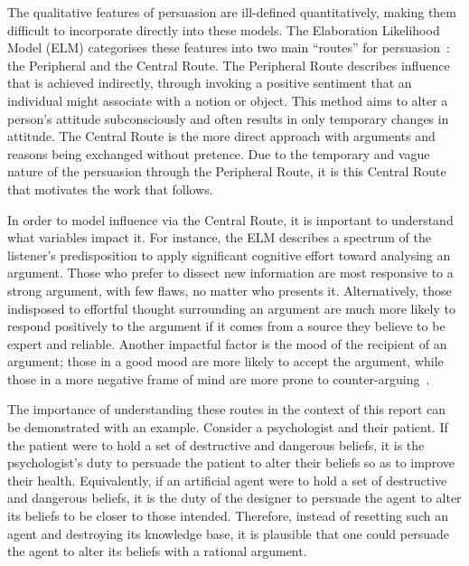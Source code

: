 The qualitative features of persuasion are ill-defined quantitatively, making them difficult to incorporate directly into these models. The Elaboration Likelihood Model (ELM) categorises these features into two main ``routes'' for persuasion~\cite{Petty1997ThePsychology}: the Peripheral and the Central Route. The Peripheral Route describes influence that is achieved indirectly, through invoking a positive sentiment that an individual might associate with a notion or object. This method aims to alter a person's attitude subconsciously and often results in only temporary changes in attitude. The Central Route is the more direct approach with arguments and reasons being exchanged without pretence. Due to the temporary and vague nature of the persuasion through the Peripheral Route, it is this Central Route that motivates the work that follows. 

In order to model influence via the Central Route, it is important to understand what variables impact it. For instance, the ELM describes a spectrum of the listener's predisposition to apply significant cognitive effort toward analysing an argument. Those who prefer to dissect new information are most responsive to a strong argument, with few flaws, no matter who presents it. Alternatively, those indisposed to effortful thought surrounding an argument are much more likely to respond positively to the argument if it comes from a source they believe to be expert and reliable. Another impactful factor is the mood of the recipient of an argument; those in a good mood are more likely to accept the argument, while those in a more negative frame of mind are more prone to counter-arguing~\cite{Petty1997ThePsychology}. 

The importance of understanding these routes in the context of this report can be demonstrated with an example. Consider a psychologist and their patient. If the patient were to hold a set of destructive and dangerous beliefs, it is the psychologist's duty to persuade the patient to alter their beliefs so as to improve their health. Equivalently, if an artificial agent were to hold a set of destructive and dangerous beliefs, it is the duty of the designer to persuade the agent to alter its beliefs to be closer to those intended.  Therefore, instead of resetting such an agent and destroying its knowledge base, it is plausible that one could persuade the agent to alter its beliefs with a rational argument. 

